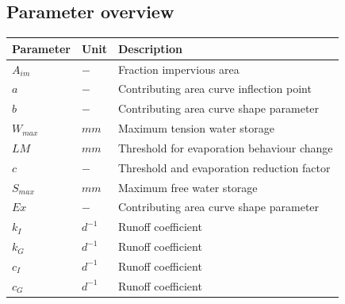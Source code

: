 \subsection{Parameter overview}
\begin{table}[htbp]
  \centering
    \begin{tabular}{lll}
    \toprule
    Parameter & Unit  & Description \\
    \midrule
    $A_{im}$ & $-$   & Fraction impervious area \\
    $a$   & $-$   & Contributing area curve inflection point \\
    $b$   & $-$   & Contributing area curve shape parameter \\
    $W_{max}$ & $mm$  & Maximum tension water storage \\
    $LM$  & $mm$  & Threshold for evaporation behaviour change \\
    $c$   & $-$   & Threshold and evaporation reduction factor \\
    $S_{max}$ & $mm$  & Maximum free water storage \\
    $Ex$  & $-$   & Contributing area curve shape parameter \\
    $k_I$ & $d^{-1}$ & Runoff coefficient \\
    $k_G$ & $d^{-1}$ & Runoff coefficient \\
    $c_I$ & $d^{-1}$ & Runoff coefficient \\
    $c_G$ & $d^{-1}$ & Runoff coefficient \\
    \bottomrule
    \end{tabular}%
  \label{tab:addlabel}%
\end{table}%
